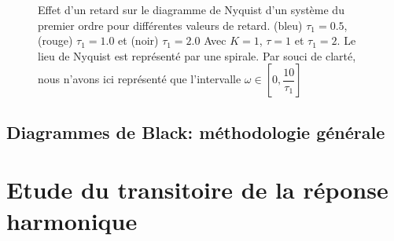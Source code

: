 \begin{figure}[!h]
\begin{center}
\end{center}
    \caption{Effet d'un retard sur le diagramme de Nyquist d'un système du premier ordre 
         pour différentes valeurs de retard. (bleu) $\tau_1=0.5$, (rouge) $\tau_1=1.0$ 
         et (noir) $\tau_1=2.0$
         Avec $K=1$, $\tau=1$ et $\tau_1=2$. Le lieu de Nyquist est représenté par 
         une spirale. Par souci de clarté, nous n'avons ici représenté que l'intervalle $\omega\in[0,\dfrac{10}{\tau_1}]$ 
         \label{fig-nyquist_effet_retard_2}}
\end{figure}


\subsection{Diagrammes de Black: méthodologie générale}




\section{Etude du transitoire de la réponse harmonique}


